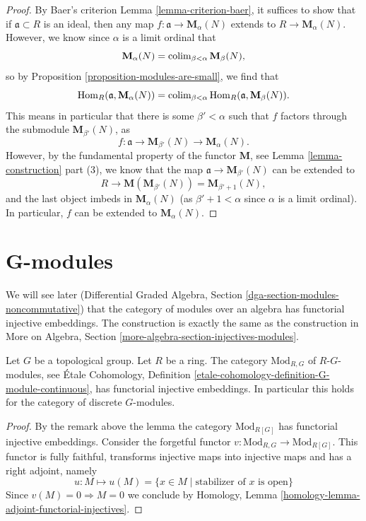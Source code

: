 \begin{proof}
By Baer's criterion
Lemma \ref{lemma-criterion-baer},
it suffices to show that if $\mathfrak{a} \subset R$ is an ideal, then
any map $f : \mathfrak{a} \to \mathbf{M}_\alpha(N)$ extends to
$R \to \mathbf{M}_\alpha(N)$. However, we know since $\alpha$ is a limit
ordinal that
$$
\mathbf{M}_{\alpha}(N) =
\mathop{\mathrm{colim}}\nolimits_{\beta < \alpha} \mathbf{M}_{\beta}(N),
$$
so by
Proposition \ref{proposition-modules-are-small},
we find that
$$
\mathop{\mathrm{Hom}}\nolimits_R(\mathfrak{a}, \mathbf{M}_{\alpha}(N)) =
\mathop{\mathrm{colim}}\nolimits_{\beta < \alpha} \mathop{\mathrm{Hom}}\nolimits_R(\mathfrak a, \mathbf{M}_{\beta}(N)).
$$
This means in particular that there is some $\beta' < \alpha$
such that $f$ factors through the submodule $\mathbf{M}_{\beta'}(N)$, as
$$
f : \mathfrak{a} \to \mathbf{M}_{\beta'}(N) \to
\mathbf{M}_{\alpha}(N).
$$
However, by the fundamental property of the functor $\mathbf{M}$,
see Lemma \ref{lemma-construction} part (3),
we know that the map $\mathfrak{a} \to \mathbf{M}_{\beta'}(N)$
can be extended to
$$
R \to \mathbf{M}( \mathbf{M}_{\beta'}(N)) =
\mathbf{M}_{\beta' + 1}(N),
$$
and the last object imbeds in $\mathbf{M}_{\alpha}(N)$ (as
$\beta' + 1 < \alpha$ since $\alpha$ is a limit ordinal).
In particular, $f$ can be extended to $\mathbf{M}_{\alpha}(N)$.
\end{proof}




\section{G-modules}
\label{section-G-modules}

\noindent
We will see later
(Differential Graded Algebra, Section \ref{dga-section-modules-noncommutative})
that the category of modules over an algebra has
functorial injective embeddings. The construction is exactly the same
as the construction in
More on Algebra, Section \ref{more-algebra-section-injectives-modules}.

\begin{lemma}
\label{lemma-G-modules}
Let $G$ be a topological group. Let $R$ be a ring.
The category $\text{Mod}_{R, G}$ of $R\text{-}G$-modules, see
\'Etale Cohomology, Definition
\ref{etale-cohomology-definition-G-module-continuous},
has functorial injective embeddings. In particular this holds
for the category of discrete $G$-modules.
\end{lemma}

\begin{proof}
By the remark above the lemma the category $\text{Mod}_{R[G]}$
has functorial injective embeddings.
Consider the forgetful functor
$v : \text{Mod}_{R, G} \to \text{Mod}_{R[G]}$.
This functor is fully faithful, transforms injective maps into
injective maps and has a right adjoint, namely
$$
u : M \mapsto u(M) = \{x \in M \mid \text{stabilizer of }x\text{ is open}\}
$$
Since $v(M) = 0 \Rightarrow M = 0$ we conclude by
Homology, Lemma \ref{homology-lemma-adjoint-functorial-injectives}.
\end{proof}



